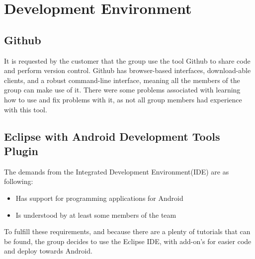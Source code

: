 \chapter{Development Environment}


\section{Github}

\label{def:githubDev}It is requested by the customer that the group use the tool Github to share code and perform version control. Github has browser-based interfaces, download-able clients, and a robust command-line interface, meaning all the members of the group can make use of it. There were some problems associated with learning how to use and fix problems with it, as not all group members had experience with this tool. 

\section{Eclipse with Android Development Tools Plugin}
The demands from the Integrated Development Environment(IDE) are as following:
\begin{itemize}
\item Has support for programming applications for Android
\item Is understood by at least some members of the team
\end{itemize}
To fulfill these requirements, and because there are a plenty of tutorials that can be found, the group decides to use the Eclipse IDE, with add-on's for easier code and deploy towards Android. 


 
